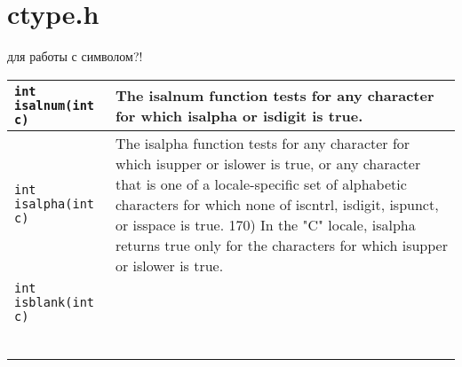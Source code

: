 \documentclass[myc.tex]{subfiles}
\begin{document}
\section{ctype.h}

для работы с символом?!

\noindent
\begin{small}
\begin{tabularx}{\textwidth}{|l|X|}
\hline
\texttt{int isalnum(int c)} & The isalnum function tests for any character for which isalpha or isdigit is true.\\
\hline
\texttt{int isalpha(int c)} & The isalpha function tests for any character for which isupper or islower is true,
or any character that is one of a locale-specific set of alphabetic characters for which none of iscntrl, isdigit, ispunct, or isspace is true. 170) In the "C" locale,
isalpha returns true only for the characters for which isupper or islower is true.\\
\hline
\texttt{int isblank(int c)} & \\
\hline
\texttt{} & \\
\hline
\texttt{} & \\
\hline
\texttt{} & \\
\hline
\texttt{} & \\
\hline
\texttt{} & \\
\hline
\texttt{} & \\
\hline
\end{tabularx}
\end{small}
\end{document}
